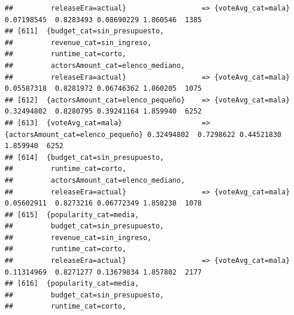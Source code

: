 \documentclass[
]{article}
\begin{document}
\begin{verbatim}
##         releaseEra=actual}                  => {voteAvg_cat=mala}                0.07198545  0.8283493 0.08690229 1.860546  1385
## [611]  {budget_cat=sin_presupuesto,                                                                                             
##         revenue_cat=sin_ingreso,                                                                                                
##         runtime_cat=corto,                                                                                                      
##         actorsAmount_cat=elenco_mediano,                                                                                        
##         releaseEra=actual}                  => {voteAvg_cat=mala}                0.05587318  0.8281972 0.06746362 1.860205  1075
## [612]  {actorsAmount_cat=elenco_pequeño}    => {voteAvg_cat=mala}                0.32494802  0.8280795 0.39241164 1.859940  6252
## [613]  {voteAvg_cat=mala}                   => {actorsAmount_cat=elenco_pequeño} 0.32494802  0.7298622 0.44521830 1.859940  6252
## [614]  {budget_cat=sin_presupuesto,                                                                                             
##         runtime_cat=corto,                                                                                                      
##         actorsAmount_cat=elenco_mediano,                                                                                        
##         releaseEra=actual}                  => {voteAvg_cat=mala}                0.05602911  0.8273216 0.06772349 1.858238  1078
## [615]  {popularity_cat=media,                                                                                                   
##         budget_cat=sin_presupuesto,                                                                                             
##         revenue_cat=sin_ingreso,                                                                                                
##         runtime_cat=corto,                                                                                                      
##         releaseEra=actual}                  => {voteAvg_cat=mala}                0.11314969  0.8271277 0.13679834 1.857802  2177
## [616]  {popularity_cat=media,                                                                                                   
##         budget_cat=sin_presupuesto,                                                                                             
##         runtime_cat=corto,                                                                                                      

\end{verbatim}
\end{document}
